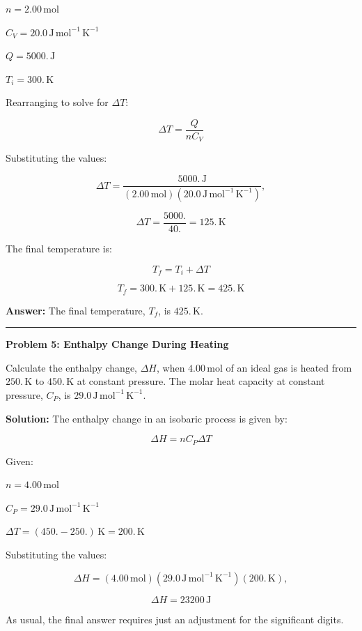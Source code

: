 \documentclass[
  9pt,
]{extbook}
\theoremstyle{definition}
\theoremstyle{definition}
\theoremstyle{definition}
\theoremstyle{remark}
\begin{document}
\(n = 2.00 \, \text{mol}\)

\(C_V = 20.0 \, \text{J} \, \text{mol}^{-1} \, \text{K}^{-1}\)

\(Q = 5000. \, \text{J}\)

\(T_i = 300. \, \text{K}\)

Rearranging to solve for \(\Delta T\):

\[ \Delta T = \frac{Q}{n C_V} \]

Substituting the values:

\[ \Delta T = \frac{5000. \, \text{J}}{(2.00\,\text{mol}) (20.0 \, \text{J} \, \text{mol}^{-1} \, \text{K}^{-1})},\]

\[ \Delta T = \frac{5000.}{40.} = 125. \, \text{K} \]

The final temperature is:

\[ T_f = T_i + \Delta T \]

\[ T_f = 300. \, \text{K} + 125. \, \text{K} = 425. \, \text{K} \]

\textbf{Answer:} The final temperature, \(T_f\), is \(425. \, \text{K}\).

\begin{center}\rule{0.5\linewidth}{0.5pt}\end{center}

\textbf{Problem 5: Enthalpy Change During Heating}

Calculate the enthalpy change, \(\Delta H\), when \(4.00 \, \text{mol}\) of an ideal gas is heated from \(250. \, \text{K}\) to \(450. \, \text{K}\) at constant pressure. The molar heat capacity at constant pressure, \(C_P\), is \(29.0 \, \text{J} \, \text{mol}^{-1} \, \text{K}^{-1}\).

\textbf{Solution:} The enthalpy change in an isobaric process is given by:

\[ \Delta H = n C_P \Delta T \]

Given:

\(n = 4.00 \, \text{mol}\)

\(C_P = 29.0 \, \text{J} \, \text{mol}^{-1} \, \text{K}^{-1}\)

\(\Delta T = (450. - 250.) \, \text{K} = 200. \, \text{K}\)

Substituting the values:

\[ \Delta H = (4.00\, \text{mol}) (29.0 \, \text{J} \, \text{mol}^{-1} \, \text{K}^{-1}) (200.\,\text{K}),\]

\[ \Delta H = 23200 \, \text{J} \]

As usual, the final answer requires just an adjustment for the significant digits.
\end{document}
